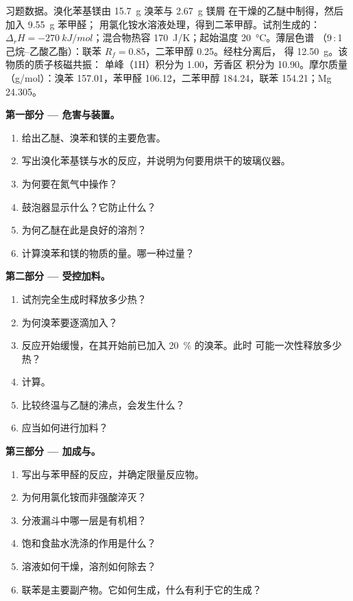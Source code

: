 \begin{problem}
\label{pb:b2:lab-techniques-2:1}
习题数据。溴化苯基镁由 \qty{15.7}{g} 溴苯与 \qty{2.67}{g} 镁屑
在干燥的乙醚中制得，然后加入 \qty{9.55}{g} 苯甲醛；
用氯化铵水溶液处理，得到二苯甲醇。试剂生成的：$\Delta_rH =
\qty{-270}{kJ/mol}$；混合物热容 \qty{170}{J/K}；起始温度 \qty{20}{\degreeCelsius}。薄层色谱
（9\,:\,1 己烷–乙酸乙酯）：联苯 $R_f = 0.85$，二苯甲醇 0.25。经柱分离后，
得 \qty{12.50}{g}。该物质的质子核磁共振： 单峰（1H）积分为 1.00，芳香区
积分为 10.90。摩尔质量（\unit{g/mol}）：溴苯 157.01，苯甲醛 106.12，二苯甲醇
184.24，联苯 154.21；Mg 24.305。

\medskip
\noindent\textbf{第一部分 --- 危害与装置。}
\begin{enumerate}
  \item 给出乙醚、溴苯和镁的主要危害。
  \item 写出溴化苯基镁与水的反应，并说明为何要用烘干的玻璃仪器。
  \item 为何要在氮气中操作？
  \item 鼓泡器显示什么？它防止什么？
  \item 为何乙醚在此是良好的溶剂？
  \item 计算溴苯和镁的物质的量。哪一种过量？
\end{enumerate}

\medskip
\noindent\textbf{第二部分 --- 受控加料。}
\begin{enumerate}[resume]
  \item 试剂完全生成时释放多少热？
  \item 为何溴苯要逐滴加入？
  \item 反应开始缓慢，在其开始前已加入 20~\% 的溴苯。此时
        可能一次性释放多少热？
  \item 计算。
  \item 比较终温与乙醚的沸点，会发生什么？
  \item 应当如何进行加料？
\end{enumerate}

\medskip
\noindent\textbf{第三部分 --- 加成与。}
\begin{enumerate}[resume]
  \item 写出与苯甲醛的反应，并确定限量反应物。
  \item 为何用氯化铵而非强酸淬灭？
  \item 分液漏斗中哪一层是有机相？
  \item 饱和食盐水洗涤的作用是什么？
  \item 溶液如何干燥，溶剂如何除去？
  \item 联苯是主要副产物。它如何生成，什么有利于它的生成？
\end{enumerate}


\end{problem}
